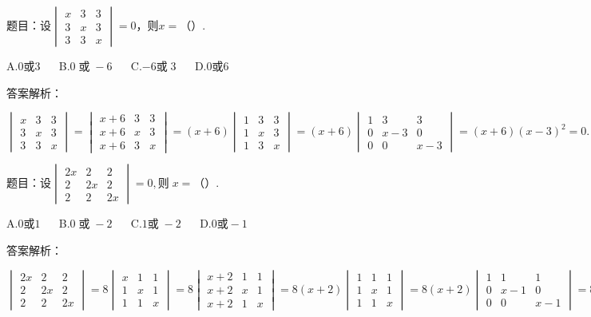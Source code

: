 题目：$设\begin{vmatrix}x&3&3\\3&x&3\\3&3&x\end{vmatrix}=0，则x=（）.$

A.$0或3$ $\quad$ B.$0\;或\;-6$ $\quad$ C.$-6或\;3$ $\quad$ D.$0或6$

答案解析：

$\begin{vmatrix}x&3&3\\3&x&3\\3&3&x\end{vmatrix}=\begin{vmatrix}x+6&3&3\\x+6&x&3\\x+6&3&x\end{vmatrix}=\left(x+6\right)\begin{vmatrix}1&3&3\\1&x&3\\1&3&x\end{vmatrix}=\left(x+6\right)\begin{vmatrix}1&3&3\\0&x-3&0\\0&0&x-3\end{vmatrix}=\left(x+6\right)\left(x-3\right)^2=0.$



题目：$设\begin{vmatrix}2x&2&2\\2&2x&2\\2&2&2x\end{vmatrix}=0,则\;x=（）.$

A.$0或1$ $\quad$ B.$0\;或\;-2$ $\quad$ C.$1或\;-2$ $\quad$ D.$0或-1$

答案解析：

$\begin{vmatrix}2x&2&2\\2&2x&2\\2&2&2x\end{vmatrix}=8\begin{vmatrix}x&1&1\\1&x&1\\1&1&x\end{vmatrix}=8\begin{vmatrix}x+2&1&1\\x+2&x&1\\x+2&1&x\end{vmatrix}=8(x+2)\begin{vmatrix}1&1&1\\1&x&1\\1&1&x\end{vmatrix}=8(x+2)\begin{vmatrix}1&1&1\\0&x-1&0\\0&0&x-1\end{vmatrix}=8(x+2)(x-1)^2=0.$



